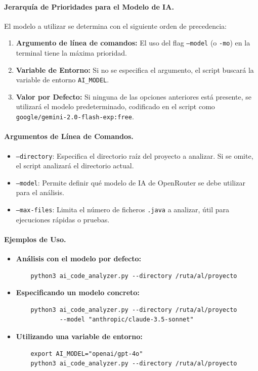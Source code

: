 \paragraph{Jerarquía de Prioridades para el Modelo de IA.}
El modelo a utilizar se determina con el siguiente orden de precedencia:
\begin{enumerate}
    \item \textbf{Argumento de línea de comandos:} El uso del flag \texttt{--model} (o \texttt{-mo}) en la terminal tiene la máxima prioridad.
    \item \textbf{Variable de Entorno:} Si no se especifica el argumento, el script buscará la variable de entorno \texttt{AI\_MODEL}.
    \item \textbf{Valor por Defecto:} Si ninguna de las opciones anteriores está presente, se utilizará el modelo predeterminado, codificado en el script como \texttt{google/gemini-2.0-flash-exp:free}.
\end{enumerate}

\paragraph{Argumentos de Línea de Comandos.}
\begin{itemize}
    \item \texttt{--directory}: Especifica el directorio raíz del proyecto a analizar. Si se omite, el script analizará el directorio actual.
    \item \texttt{--model}: Permite definir qué modelo de IA de OpenRouter se debe utilizar para el análisis.
    \item \texttt{--max-files}: Limita el número de ficheros \texttt{.java} a analizar, útil para ejecuciones rápidas o pruebas.
\end{itemize}

\paragraph{Ejemplos de Uso.}
\begin{itemize}
    \item \textbf{Análisis con el modelo por defecto:}
    \begin{verbatim}
    python3 ai_code_analyzer.py --directory /ruta/al/proyecto
    \end{verbatim}
    
    \item \textbf{Especificando un modelo concreto:}
    \begin{verbatim}
    python3 ai_code_analyzer.py --directory /ruta/al/proyecto 
            --model "anthropic/claude-3.5-sonnet"
    \end{verbatim}
    
    \item \textbf{Utilizando una variable de entorno:}
    \begin{verbatim}
    export AI_MODEL="openai/gpt-4o"
    python3 ai_code_analyzer.py --directory /ruta/al/proyecto
    \end{verbatim}
\end{itemize}

